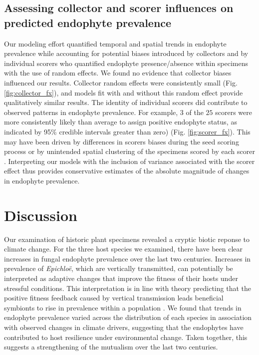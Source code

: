 \documentclass[11pt]{article}
\let\cite\citep
\begin{document}
\subsection*{Assessing collector and scorer influences on predicted endophyte prevalence}
Our modeling effort quantified temporal and spatial trends in endophyte prevalence while accounting for potential biases introduced by collectors and by individual scorers who quantified endophyte presence/absence within specimens with the use of random effects. 
We found no evidence that collector biases influenced our results. 
Collector random effects were consistently small (Fig. \ref{fig:collector_fx}), and models fit with and without this random effect provide qualitatively similar results.
The identity of individual scorers did contribute to observed patterns in endophyte prevalence.
For example, $3$ of the $25$ scorers were more consistently likely than average to assign positive endophyte status, as indicated by 95\% credible intervals greater than zero) (Fig. \ref{fig:scorer_fx}). 
This may have been driven by differences in scorers biases during the seed scoring process or by unintended spatial clustering of the specimens scored by each scorer \cite{clayton1993spatial,urdangarin2023evaluating}. 
Interpreting our models with the inclusion of variance associated with the scorer effect thus provides conservative estimates of the absolute magnitude of changes in endophyte prevalence.



\section*{Discussion}
Our examination of historic plant specimens revealed a cryptic biotic reponse to climate change. 
For the three host species we examined, there have been clear increases in fungal endophyte prevalence over the last two centuries.
Increases in prevalence of \emph{Epichloë}, which are vertically transmitted, can potentially be interpreted as adaptive changes that improve the fitness of their hosts under stressful conditions.
This interpretation is in line with theory predicting that the positive fitness feedback caused by vertical transmission leads beneficial symbionts to rise in prevalence within a population \cite{fine1975vectors}.
We found that trends in endophyte prevalence varied across the distribution of each species in association with observed changes in climate drivers, suggesting that the endophytes have contributed to host resilience under environmental change.
Taken together, this suggests a strengthening of the mutualism over the last two centuries.
\end{document}
